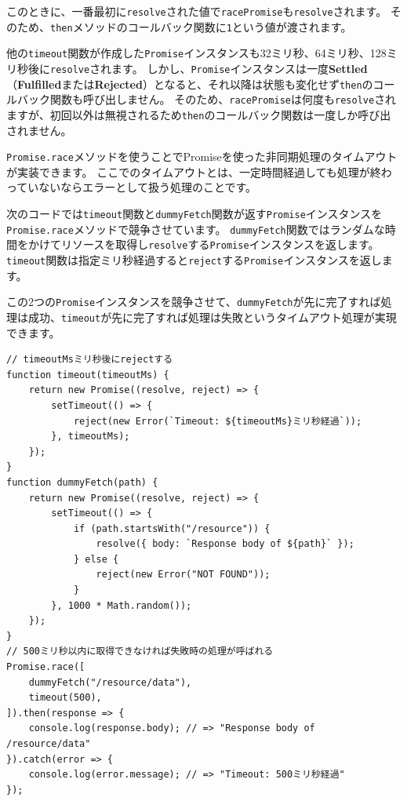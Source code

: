 このときに、一番最初に\texttt{resolve}された値で\texttt{racePromise}も\texttt{resolve}されます。
そのため、\texttt{then}メソッドのコールバック関数に\texttt{1}という値が渡されます。

他の\texttt{timeout}関数が作成した\texttt{Promise}インスタンスも32ミリ秒、64ミリ秒、128ミリ秒後に\texttt{resolve}されます。
しかし、\texttt{Promise}インスタンスは一度\textbf{Settled}（\textbf{Fulfilled}または\textbf{Rejected}）となると、それ以降は状態も変化せず\texttt{then}のコールバック関数も呼び出しません。
そのため、\texttt{racePromise}は何度も\texttt{resolve}されますが、初回以外は無視されるため\texttt{then}のコールバック関数は一度しか呼び出されません。

\texttt{Promise.race}メソッドを使うことでPromiseを使った非同期処理のタイムアウトが実装できます。
ここでのタイムアウトとは、一定時間経過しても処理が終わっていないならエラーとして扱う処理のことです。

次のコードでは\texttt{timeout}関数と\texttt{dummyFetch}関数が返す\texttt{Promise}インスタンスを\texttt{Promise.race}メソッドで競争させています。
\texttt{dummyFetch}関数ではランダムな時間をかけてリソースを取得し\texttt{resolve}する\texttt{Promise}インスタンスを返します。
\texttt{timeout}関数は指定ミリ秒経過すると\texttt{reject}する\texttt{Promise}インスタンスを返します。

この2つの\texttt{Promise}インスタンスを競争させて、\texttt{dummyFetch}が先に完了すれば処理は成功、\texttt{timeout}が先に完了すれば処理は失敗というタイムアウト処理が実現できます。

\begin{lstlisting}
// timeoutMsミリ秒後にrejectする
function timeout(timeoutMs) {
    return new Promise((resolve, reject) => {
        setTimeout(() => {
            reject(new Error(`Timeout: ${timeoutMs}ミリ秒経過`));
        }, timeoutMs);
    });
}
function dummyFetch(path) {
    return new Promise((resolve, reject) => {
        setTimeout(() => {
            if (path.startsWith("/resource")) {
                resolve({ body: `Response body of ${path}` });
            } else {
                reject(new Error("NOT FOUND"));
            }
        }, 1000 * Math.random());
    });
}
// 500ミリ秒以内に取得できなければ失敗時の処理が呼ばれる
Promise.race([
    dummyFetch("/resource/data"),
    timeout(500),
]).then(response => {
    console.log(response.body); // => "Response body of /resource/data"
}).catch(error => {
    console.log(error.message); // => "Timeout: 500ミリ秒経過"
});
\end{lstlisting}

